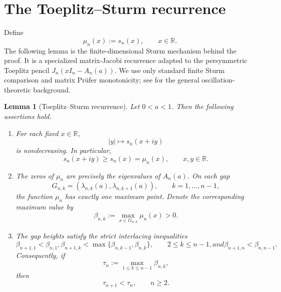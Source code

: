 \documentclass[11pt]{amsart}
\numberwithin{equation}{section}
\newcommand{\R}{\mathbb R}
\newtheorem{lemma}[theorem]{Lemma}
\begin{document}
\section{The Toeplitz--Sturm recurrence}

Define
\[
\mu_n(x):=s_n(x),\qquad x\in\R.
\]
The following lemma is the finite-dimensional Sturm mechanism behind the proof.  It is a specialized matrix-Jacobi recurrence adapted to the persymmetric Toeplitz pencil \(J_n(xI_n-A_n(a))\).  We use only standard finite Sturm comparison and matrix Pr\"ufer monotonicity; see \cite{Teschl2000,Simon2005,SchulzBaldesUrban2020} for the general oscillation-theoretic background.

\begin{lemma}[Toeplitz--Sturm recurrence]\label{lem:sturm}
Let \(0<a<1\).  Then the following assertions hold.

\begin{enumerate}
\item For each fixed \(x\in\R\),
\[
|y|\longmapsto s_n(x+iy)
\]
is nondecreasing.  In particular,
\begin{equation}\label{eq:vertical-monotonicity}
s_n(x+iy)\ge s_n(x)=\mu_n(x),
\qquad x,y\in\R.
\end{equation}

\item The zeros of \(\mu_n\) are precisely the eigenvalues of \(A_n(a)\).  On each gap
\[
G_{n,k}
=
(\lambda_{n,k}(a),\lambda_{n,k+1}(a)),
\qquad
k=1,\dots,n-1,
\]
the function \(\mu_n\) has exactly one maximum point.  Denote the corresponding maximum value by
\begin{equation}\label{eq:gap-height}
\beta_{n,k}
:=
\max_{x\in G_{n,k}}\mu_n(x)>0.
\end{equation}

\item The gap heights satisfy the strict interlacing inequalities
\begin{subequations}\label{eq:height-interlacing}
\begin{equation}\label{eq:height-left}
\beta_{n+1,1}<\beta_{n,1},
\end{equation}
\begin{equation}\label{eq:height-middle}
\beta_{n+1,k}<\max\{\beta_{n,k-1},\beta_{n,k}\},
\qquad 2\le k\le n-1,
\end{equation}
and
\begin{equation}\label{eq:height-right}
\beta_{n+1,n}<\beta_{n,n-1}.
\end{equation}
\end{subequations}
Consequently, if
\begin{equation}\label{eq:tau-def}
\tau_n:=\max_{1\le k\le n-1}\beta_{n,k},
\end{equation}
then
\begin{equation}\label{eq:tau-monotone}
\tau_{n+1}<\tau_n,
\qquad n\ge2.
\end{equation}


\end{enumerate}
\end{lemma}
\end{document}
